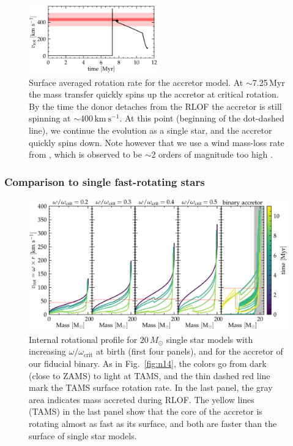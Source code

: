 \documentclass[twocolumn,twocolappendix,trackchanges]{aastex63}
\newcommand{\kms}{{\mathrm{km\ s^{-1}}}}
\DeclareRobustCommand{\Figref}[1]{Fig.~\ref{#1}}
\begin{document}
\begin{figure}[htbp]
  \includegraphics[width=0.5\textwidth]{zeta_rot}
  \caption{Surface averaged rotation rate for the accretor
    model. At $\sim$7.25\,Myr the mass transfer quickly spins
    up the accretor at critical rotation. By the time the donor
    detaches from the RLOF the accretor is still spinning at
    $\sim$$400\,\kms$. At this point (beginning of the dot-dashed line), we continue the evolution as a single star, and the accretor quickly spins down. Note however that we use a wind mass-loss rate from \cite{vink:01}, which is observed to be
    $\sim$2 orders of magnitude too high \citep{marcolino:09}.}
  \label{fig:surf_rot}
\end{figure}

\subsubsection{Comparison to single fast-rotating stars}


\begin{figure}[htbp]
  \centering
  \includegraphics[width=\textwidth]{zeta_Rotational_struct}
  \caption{Internal rotational profile for $20\,M_\odot$ single star models with
    increasing $\omega/\omega_\mathrm{crit}$ at birth (first four
    panels), and for the accretor of our fiducial binary. As in
    \Figref{fig:n14}, the colors go from dark (close to ZAMS) to light
    at TAMS, and the thin dashed red line mark the TAMS surface
    rotation rate. In the last panel, the gray area indicates mass
    accreted during RLOF. The yellow lines (TAMS) in the last panel
    show that the core of the accretor is rotating almost as fast as
    its surface, and both are faster than the surface of single star
    models.}
  \label{fig:struct_rot}
\end{figure}
\end{document}
